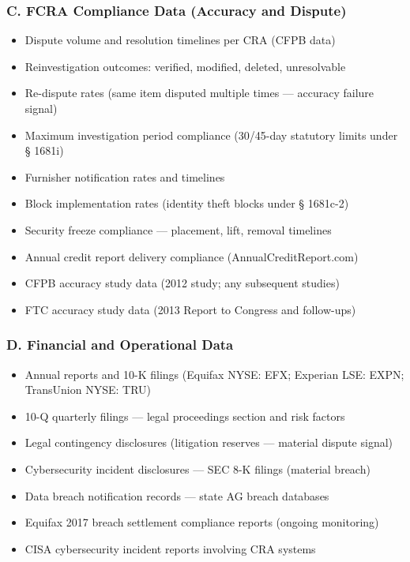 \documentclass[a4paper,11pt]{article}
\begin{document}
	\subsubsection{C. FCRA Compliance Data (Accuracy and Dispute)}
	
	\begin{itemize}[leftmargin=1.5em]
		\item Dispute volume and resolution timelines per CRA (CFPB data)
		\item Reinvestigation outcomes: verified, modified, deleted, unresolvable
		\item Re-dispute rates (same item disputed multiple times — accuracy failure signal)
		\item Maximum investigation period compliance (30/45-day statutory limits under § 1681i)
		\item Furnisher notification rates and timelines
		\item Block implementation rates (identity theft blocks under § 1681c-2)
		\item Security freeze compliance — placement, lift, removal timelines
		\item Annual credit report delivery compliance (AnnualCreditReport.com)
		\item CFPB accuracy study data (2012 study; any subsequent studies)
		\item FTC accuracy study data (2013 Report to Congress and follow-ups)
	\end{itemize}
	
	\subsubsection{D. Financial and Operational Data}
	
	\begin{itemize}[leftmargin=1.5em]
		\item Annual reports and 10-K filings (Equifax NYSE: EFX; Experian LSE: EXPN; TransUnion NYSE: TRU)
		\item 10-Q quarterly filings — legal proceedings section and risk factors
		\item Legal contingency disclosures (litigation reserves — material dispute signal)
		\item Cybersecurity incident disclosures — SEC 8-K filings (material breach)
		\item Data breach notification records — state AG breach databases
		\item Equifax 2017 breach settlement compliance reports (ongoing monitoring)
		\item CISA cybersecurity incident reports involving CRA systems
	\end{itemize}
	
\end{document}
